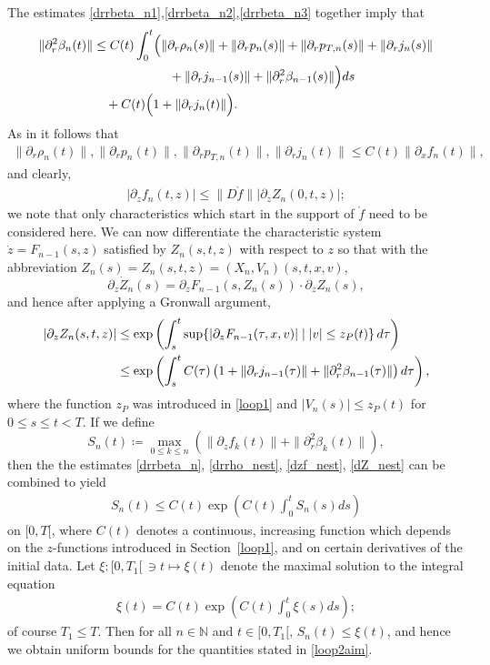 \documentclass[11pt]{article}
\def\N{\mathbb N}
\begin{document}
The estimates \eqref{drrbeta_n1},\eqref{drrbeta_n2},\eqref{drrbeta_n3} together
imply that
\begin{align}\label{drrbeta_n}
 \|\partial_r^2 \beta_n(t)\|
 &\leq
 C(t) \int_0^t \Bigl(\|\partial_r \rho_n(s)\| + \|\partial_r p_n(s)\|
 + \|\partial_r p_{T,n}(s)\|
 + \|\partial_r j_n(s)\|  \notag \\
 &\qquad \qquad\qquad {} + \|\partial_r j_{n-1}(s)\|
 + \|\partial_r^2 \beta_{n-1}(s)\|\Bigr) ds \notag\\
 &\quad {}+ C(t)\Bigl( 1 + \|\partial_r j_n(t)\|\Bigr).
\end{align}
As in \cite[Lemma 6.8]{GB} it follows that
\begin{align}\label{drrho_nest}
 \|\partial_r \rho_n(t)\|, \|\partial_r p_n(t)\|, 
 \|\partial_r p_{T,n}(t)\|, \|\partial_r j_n(t)\| \leq C(t) \|\partial_x f_n(t)\|,
\end{align}
and clearly,
\begin{align}\label{dzf_nest}
  |\partial_z f_n(t,z)| \leq \|D \mathring{f}\| |\partial_z Z_n(0,t,z)|;
\end{align}
we note that only characteristics which start in the support of $\mathring{f}$
need to be considered here.
We can now differentiate the characteristic system
$\dot z = F_{n-1}(s,z)$ satisfied by $Z_n(s,t,z)$ with
respect to $z$ so that with the abbreviation
$Z_n(s) = Z_n(s,t,z) = (X_n,V_n)(s,t,x,v)$,
\[
\partial_z \dot Z_n(s) =\partial_z F_{n-1}(s,Z_n(s)) \cdot \partial_z Z_n(s),
\]
and hence after applying a Gronwall argument,
\begin{align}\label{dZ_nest}
  |\partial_z Z_n(s,t,z)|
  &\leq \exp\left(\int_s^t
  \sup\{|\partial_z F_{n-1}(\tau,x,v)| \mid
  |v| \leq z_P(t)\}\, d\tau\right)\notag \\
  &\leq \exp\left(\int_s^t C(\tau)\left(1+\|\partial_r j_{n-1}(\tau)\|
  +\|\partial_r^2 \beta_{n-1}(\tau)\|\right) d\tau\right),
\end{align}
where the function $z_P$ was introduced in \ref{loop1} and $|V_n(s)|\leq z_P(t)$
for $0\leq s\leq t < T$. 
If we define
\[
S_n(t)\coloneqq \max_{0\leq k\leq n}\left(\|\partial_z f_k(t)\| +
\|\partial_r^2 \beta_k(t)\|\right),
\]
then the the estimates \eqref{drrbeta_n}, \eqref{drrho_nest}, \eqref{dzf_nest},
\eqref{dZ_nest} can be combined to yield
\begin{align}\label{S_nest}
  S_n(t) \leq C(t) \exp\left(C(t) \int_0^t S_n(s) ds\right)
\end{align}
on $[0,T[$, where $C(t)$ denotes a continuous, increasing function which depends
on the $z$-functions introduced in Section~\ref{loop1},
and on certain derivatives of the
initial data. Let 
$\xi \colon [0,T_1[\,\ni t\mapsto \xi(t)$ denote the maximal solution
to the integral equation
\begin{align}\label{xi}
  \xi(t) = C(t) \exp\left(C(t) \int_0^t \xi(s) ds\right);
\end{align}   
of course $T_1 \leq T$. Then for all $n\in \N$ and $t\in [0,T_1[$,
$S_n(t) \leq \xi(t)$, and hence we obtain uniform bounds for
the quantities stated in \eqref{loop2aim}.
%
%
\end{document}
